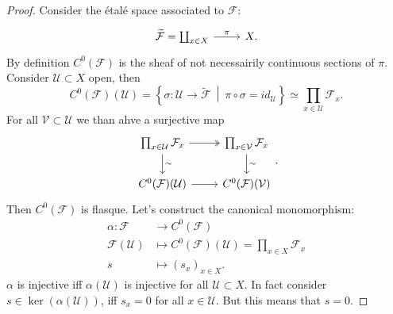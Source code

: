 \documentclass[../Main]{subfiles}
\begin{document}
\begin{proof}
	Consider the \'etal\'e space associated to $\mathcal{F}$:
	\begin{equation}
	\begin{tikzcd}
		\widetilde{\mathcal{F}} = \coprod_{x \in X} \arrow[r, "\pi", rightarrow] &
		X.
	\end{tikzcd}
	\end{equation} 
	By definition $C^0(\mathcal{F})$ is the sheaf of not necessairily
	continuous sections of $\pi$.
	Consider $\mathcal{U} \subset X$ open, then
	\begin{equation}
		C^0(\mathcal{F})(\mathcal{U}) =
		\left\{ \sigma\colon \mathcal{U} \to \widetilde{\mathcal{F}}
		\ \middle|\ \pi \circ \sigma = id_{\mathcal{U}} \right\}
		\simeq \prod_{x \in \mathcal{U}} \mathcal{F}_{x}
	.\end{equation} 
	For all $\mathcal{V} \subset \mathcal{U}$ we than ahve a surjective map
	\begin{equation}
	\begin{tikzcd}
		\prod_{x \in \mathcal{U}} \mathcal{F}_{x} \arrow[r, "", twoheadrightarrow] 
		\arrow[d, "\sim", rightarrow] &
		\prod_{x \in \mathcal{V}} \mathcal{F}_{x} \arrow[d, "\sim", rightarrow] \\
		C^0(\mathcal{F})(\mathcal{U}) \arrow[r, "", rightarrow] &
		C^0(\mathcal{F})(\mathcal{V})
	\end{tikzcd}
	.\end{equation} 
	Then $C^0(\mathcal{F})$ is flasque.
	Let's construct the canonical monomorphism:
	\begin{align}
		\alpha\colon \mathcal{F} &\longrightarrow C^0(\mathcal{F}) \\
		\mathcal{F}(\mathcal{U}) &\longmapsto C^0(\mathcal{F})(\mathcal{U})
		= \prod_{x \in X} \mathcal{F}_{x} \nonumber \\
		s &\longmapsto \left( s_x \right)_{x \in X} \nonumber
	.\end{align} 
	$\alpha$ is injective iff $\alpha(\mathcal{U})$ is injective for all $\mathcal{U} \subset X$.
	In fact consider $s \in \ker \left( \alpha(\mathcal{U}) \right)$,
	iff $s_x = 0$ for all $x \in \mathcal{U}$.
	But this means that $s = 0$.
\end{proof}
\end{document}
